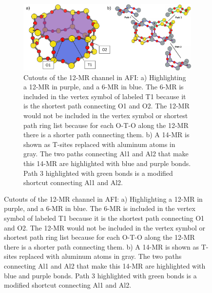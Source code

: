 \documentclass[preprint,numrefs,noinfo,sort&compress]{elsarticle}
\begin{document}
\begin{figure}
\begin{figure}[H]
\centering
\includegraphics[width=\textwidth]{figures/chapter-3/afi-14-and-modified.pdf}
\caption{Cutouts of the 12-MR channel in AFI: a) Highlighting a 12-MR in purple, and a 6-MR in blue. The 6-MR is included in the vertex symbol of labeled T1 because it is the shortest path connecting O1 and O2. The 12-MR would not be included in the vertex symbol or shortest path ring list because for each O-T-O along the 12-MR there is a shorter path connecting them. b) A 14-MR is shown as T-sites replaced with aluminum atoms in gray. The two paths connecting Al1 and Al2 that make this 14-MR are highlighted with blue and purple bonds. Path 3 highlighted with green bonds is a modified shortcut connecting Al1 and Al2. \label{fig:3.3}}
\end{figure}
\end{figure}

\end{document}
